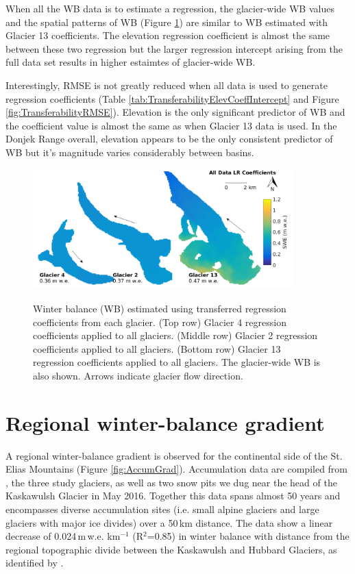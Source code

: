 \documentclass{sfuthesis}
\begin{document}
When all the WB data is to estimate a regression, the glacier-wide WB values and the spatial patterns of WB (Figure \ref{fig:MapTransferabilityComboMean}) are similar to WB estimated with Glacier 13 coefficients. The elevation regression coefficient is almost the same between these two regression but the larger regression intercept arising from the full data set results in higher estaimtes of glacier-wide WB. 

Interestingly, RMSE is not greatly reduced when all data is used to generate regression coefficients (Table \ref{tab:TransferabilityElevCoeffIntercept} and Figure \ref{fig:TransferabilityRMSE}). Elevation is the only significant predictor of WB and the coefficient value is almost the same as when Glacier 13 data is used. In the Donjek Range overall, elevation appears to be the only consistent predictor of WB but it's magnitude varies considerably between basins. 

\begin{figure}
	\centering
	\includegraphics[width =0.9\textwidth]{MapTransferabilityComboCoeffs.png}\\
	\caption{Winter balance (WB) estimated using transferred regression coefficients from each glacier. (Top row) Glacier 4 regression coefficients applied to all glaciers. (Middle row) Glacier 2 regression coefficients applied to all glaciers. (Bottom row) Glacier 13 regression coefficients applied to all glaciers. The glacier-wide WB is also shown. Arrows indicate glacier flow direction.}
	\label{fig:MapTransferabilityComboMean}
\end{figure}


 \section{Regional winter-balance gradient}
 \label{sec:DonjekAccumGrad}

A regional winter-balance gradient is observed for the continental side of the St. Elias Mountains (Figure \ref{fig:AccumGrad}). Accumulation data are compiled from \cite{Taylor1969}, the three study glaciers, as well as two snow pits we dug near the head of the Kaskawulsh Glacier in May 2016. Together this data spans almost 50 years and encompasses diverse accumulation sites (i.e. small alpine glaciers and large glaciers with major ice divides) over a 50\,km distance. The data show a linear decrease of 0.024\,m\,w.e. km$^{-1}$ (R$^2$=0.85) in winter balance with distance from the regional topographic divide between the Kaskawulsh and Hubbard Glaciers, as identified by \cite{Taylor1969}.
\end{document}
